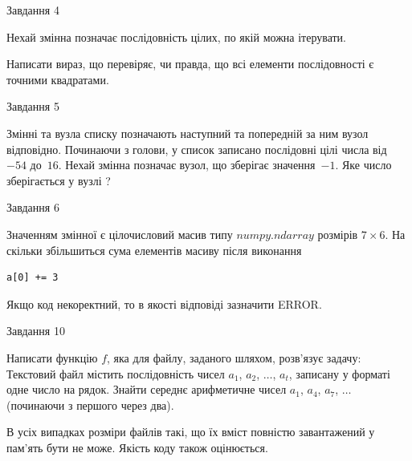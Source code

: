\documentclass[12pt, ukrainian]{article}
\begin{document}
{               
{\begin{center}Завдання {4}\end{center}}
\vspace{-6mm}
Нехай змінна  позначає послідовність цілих, по якій можна ітерувати.

Написати вираз, що перевіряє, чи правда, що всі елементи послідовності є точними квадратами.\par

\vspace{10mm}
               
{\begin{center}Завдання {5}\end{center}}
\vspace{-6mm}
Змінні  та  вузла списку позначають наступний та попередній за ним вузол відповідно. Починаючи з голови, у список записано послідовні цілі числа від~$-54$ до~$16$. Нехай змінна  позначає вузол, що зберігає значення~$-1$.
Яке число зберігається у вузлі  ?\par

               
{\begin{center}Завдання {6}\end{center}}
\vspace{-6mm}
Значенням змінної  є цілочисловий масив типу $numpy.ndarray$ розмірів $7{\times}6$. На скільки збільшиться сума елементів масиву  після виконання
\begin{verbatim}
a[0] += 3
\end{verbatim}


Якщо код некоректний, то в якості відповіді зазначити ERROR.\par

               
{\begin{center}Завдання {10}\end{center}}
\vspace{-6mm}

Написати функцію $f$, яка для файлу, заданого шляхом, розв’язує задачу:\\ Текстовий файл містить послідовність чисел $a_1$, $a_2$, $\ldots$, $a_t$, записану у форматі одне число на рядок. Знайти середнє арифметичне чисел $a_1$, $a_4$, $a_7$, $\ldots$ (починаючи з першого через два).

В усіх випадках розміри файлів такі, що їх вміст повністю завантажений у пам'ять бути не може. Якість коду також оцінюється.



}
\end{document}
